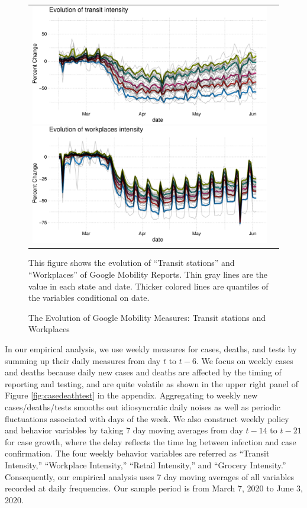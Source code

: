 \documentclass[11pt,reqno,letter]{amsart}
\theoremstyle{definition}
\begin{document}
\begin{figure}\caption{The Evolution of Google Mobility Measures: Transit stations and Workplaces\label{fig:transit-workplaces}}\vspace{0.1cm}
    \begin{tabular}{cc}
      \includegraphics[width=0.5\linewidth]{tables_and_figures/transit}
      \includegraphics[width=0.5\linewidth]{tables_and_figures/workplaces}
       \end{tabular}
        \begin{flushleft}
        \scriptsize{This figure shows the evolution of ``Transit stations'' and  ``Workplaces'' of Google Mobility
      Reports. Thin gray lines are the value in each state and date. Thicker colored lines are
      quantiles of the variables conditional on date.}
      \end{flushleft}
\end{figure}



In our empirical analysis, we use weekly measures for cases, deaths,
and tests by summing up their daily measures from day \(t\) to
\(t-6\).  We focus on weekly cases and deaths because daily new cases and deaths are
affected by the timing of reporting and testing, and are quite
volatile as shown in the upper right panel of Figure \ref{fig:casedeathtest} in the
appendix.  Aggregating to weekly new cases/deaths/tests smooths
out idiosyncratic daily noises as well as periodic fluctuations
associated with days of the week.
We also construct weekly policy and
behavior variables by taking 7 day moving averages from day \(t-14\) to
\(t-21\) for case growth, where the  delay reflects the time lag between infection and case confirmation. The four weekly behavior variables are referred as ``Transit
Intensity,'' ``Workplace Intensity,'' ``Retail Intensity,'' and ``Grocery
Intensity.'' Consequently, our empirical analysis uses 7 day moving averages of all variables recorded at daily frequencies. Our sample period is from March 7, 2020 to June 3, 2020.
\end{document}
